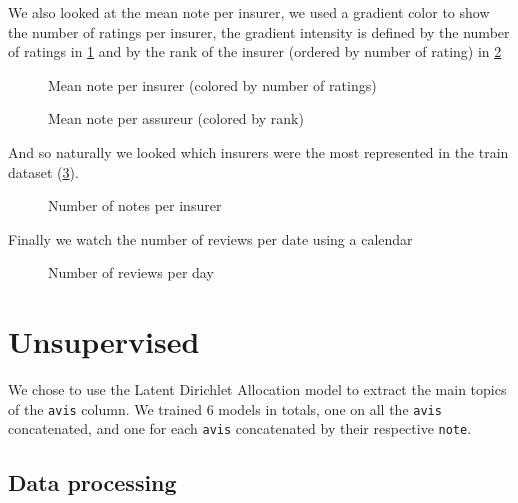 \documentclass[a4paper, 12pt, one column]{article}
\begin{document}
\restoregeometry

We also looked at the mean note per insurer, we used a gradient color to show the number of ratings per insurer, the gradient intensity is defined by the number of ratings in \cref{fig:mean_note_per_assureur} and by the rank of the insurer (ordered by number of rating) in \cref{fig:mean_note_per_assureur_linear}

\begin{figure}[H]
    \advance\leftskip-3cm
    
    \caption{Mean note per insurer (colored by number of ratings)}
    \label{fig:mean_note_per_assureur}
\end{figure}
\begin{figure}[H]
    \advance\leftskip-3cm
    
    \caption{Mean note per assureur (colored by rank)}
    \label{fig:mean_note_per_assureur_linear}
\end{figure}
\restoregeometry

And so naturally we looked which insurers were the most represented in the train dataset (\cref{fig:nbnote_per_assureur}).

\begin{figure}[H]
    \advance\leftskip-2.5cm
    
    \caption{Number of notes per insurer}
    \label{fig:nbnote_per_assureur}
\end{figure}

Finally we watch the number of reviews per date using a calendar 

\begin{figure}[H]
    \centering
    
    \caption{Number of reviews per day}
    \label{fig:count_calendar}
\end{figure}
\restoregeometry

\section{Unsupervised}

We chose to use the Latent Dirichlet Allocation model to extract the main topics of the \lstinline{avis} column. 
We trained 6 models in totals, one on all the \lstinline{avis} concatenated, and one for each \lstinline{avis} concatenated by their respective \lstinline{note}. 

\subsection{Data processing}
\end{document}
